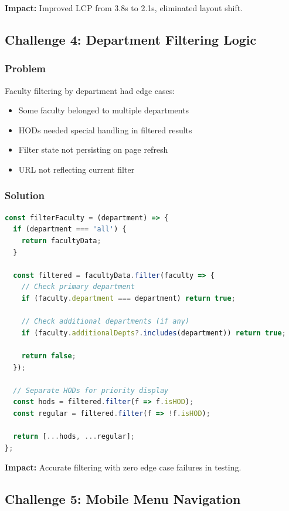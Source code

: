 \documentclass[12pt,a4paper]{report}
\begin{document}
\textbf{Impact:} Improved LCP from 3.8s to 2.1s, eliminated layout shift.

\subsection{Challenge 4: Department Filtering Logic}

\subsubsection*{Problem}
Faculty filtering by department had edge cases:
\begin{itemize}
    \item Some faculty belonged to multiple departments
    \item HODs needed special handling in filtered results
    \item Filter state not persisting on page refresh
    \item URL not reflecting current filter
\end{itemize}

\subsubsection*{Solution}
\begin{lstlisting}[language=JavaScript, caption=Enhanced Filtering Logic]
const filterFaculty = (department) => {
  if (department === 'all') {
    return facultyData;
  }
  
  const filtered = facultyData.filter(faculty => {
    // Check primary department
    if (faculty.department === department) return true;
    
    // Check additional departments (if any)
    if (faculty.additionalDepts?.includes(department)) return true;
    
    return false;
  });
  
  // Separate HODs for priority display
  const hods = filtered.filter(f => f.isHOD);
  const regular = filtered.filter(f => !f.isHOD);
  
  return [...hods, ...regular];
};
\end{lstlisting}

\textbf{Impact:} Accurate filtering with zero edge case failures in testing.

\subsection{Challenge 5: Mobile Menu Navigation}
\end{document}
